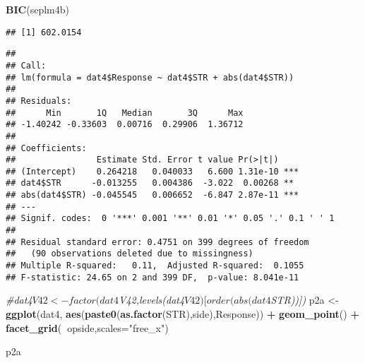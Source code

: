 \documentclass[
]{article}
\newenvironment{Shaded}{\begin{snugshade}}{\end{snugshade}}
\newcommand{\CommentTok}[1]{\textcolor[rgb]{0.56,0.35,0.01}{\textit{#1}}}
\newcommand{\DataTypeTok}[1]{\textcolor[rgb]{0.13,0.29,0.53}{#1}}
\newcommand{\KeywordTok}[1]{\textcolor[rgb]{0.13,0.29,0.53}{\textbf{#1}}}
\newcommand{\NormalTok}[1]{#1}
\newcommand{\OperatorTok}[1]{\textcolor[rgb]{0.81,0.36,0.00}{\textbf{#1}}}
\newcommand{\StringTok}[1]{\textcolor[rgb]{0.31,0.60,0.02}{#1}}
\begin{document}
\begin{Shaded}
\begin{Highlighting}[]
\KeywordTok{BIC}\NormalTok{(seplm4b)}
\end{Highlighting}
\end{Shaded}

\begin{verbatim}
## [1] 602.0154
\end{verbatim}

\begin{Shaded}
\end{Shaded}

\begin{verbatim}
## 
## Call:
## lm(formula = dat4$Response ~ dat4$STR + abs(dat4$STR))
## 
## Residuals:
##      Min       1Q   Median       3Q      Max 
## -1.40242 -0.33603  0.00716  0.29906  1.36712 
## 
## Coefficients:
##                Estimate Std. Error t value Pr(>|t|)    
## (Intercept)    0.264218   0.040033   6.600 1.31e-10 ***
## dat4$STR      -0.013255   0.004386  -3.022  0.00268 ** 
## abs(dat4$STR) -0.045545   0.006652  -6.847 2.87e-11 ***
## ---
## Signif. codes:  0 '***' 0.001 '**' 0.01 '*' 0.05 '.' 0.1 ' ' 1
## 
## Residual standard error: 0.4751 on 399 degrees of freedom
##   (90 observations deleted due to missingness)
## Multiple R-squared:   0.11,  Adjusted R-squared:  0.1055 
## F-statistic: 24.65 on 2 and 399 DF,  p-value: 8.041e-11
\end{verbatim}

\begin{Shaded}
\begin{Highlighting}[]
\CommentTok{#dat4$V42 <- factor(dat4$V42,levels(dat4$V42)[order(abs(dat4$STR))])}
\NormalTok{p2a <-}\StringTok{ }\KeywordTok{ggplot}\NormalTok{(dat4, }\KeywordTok{aes}\NormalTok{(}\KeywordTok{paste0}\NormalTok{(}\KeywordTok{as.factor}\NormalTok{(STR),side),Response)) }\OperatorTok{+}\StringTok{ }\KeywordTok{geom_point}\NormalTok{() }\OperatorTok{+}\StringTok{ }\KeywordTok{facet_grid}\NormalTok{(}\OperatorTok{~}\NormalTok{opside,}\DataTypeTok{scales=}\StringTok{"free_x"}\NormalTok{)}

\NormalTok{p2a}
\end{Highlighting}
\end{Shaded}
\end{document}
